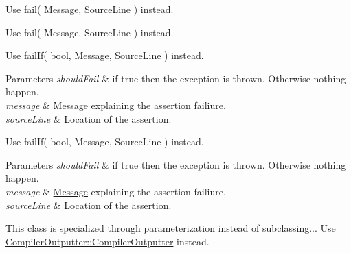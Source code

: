 
\begin{DoxyRefList}
\item[\label{deprecated__deprecated000009}%
\hypertarget{deprecated__deprecated000009}{}%
Member \hyperlink{postprocess_8h_acd2361a766665ce2dbfb3eae201b784d}{ai\+Process\+\_\+\+Convert\+To\+Left\+Handed} ]


\item[\label{deprecated__deprecated000001}%
\hypertarget{deprecated__deprecated000001}{}%
Member \hyperlink{struct_asserter_a63f859e25225743d5d7f6bb50d216192}{Asserter\+:\+:fail} (std\+::string message, const \hyperlink{class_source_line}{Source\+Line} \&source\+Line=\hyperlink{class_source_line}{Source\+Line()})]Use fail( Message, Source\+Line ) instead. 

Use fail( Message, Source\+Line ) instead.  
\item[\label{deprecated__deprecated000002}%
\hypertarget{deprecated__deprecated000002}{}%
Member \hyperlink{struct_asserter_aeea5303f41ac81f9eeff178d19833b1d}{Asserter\+:\+:fail\+If} (bool should\+Fail, std\+::string message, const \hyperlink{class_source_line}{Source\+Line} \&source\+Line=\hyperlink{class_source_line}{Source\+Line()})]Use fail\+If( bool, Message, Source\+Line ) instead. 
\begin{DoxyParams}{Parameters}
{\em should\+Fail} & if {\ttfamily true} then the exception is thrown. Otherwise nothing happen. \\
\hline
{\em message} & \hyperlink{class_message}{Message} explaining the assertion failiure. \\
\hline
{\em source\+Line} & Location of the assertion. \\
\hline
\end{DoxyParams}
Use fail\+If( bool, Message, Source\+Line ) instead. 
\begin{DoxyParams}{Parameters}
{\em should\+Fail} & if {\ttfamily true} then the exception is thrown. Otherwise nothing happen. \\
\hline
{\em message} & \hyperlink{class_message}{Message} explaining the assertion failiure. \\
\hline
{\em source\+Line} & Location of the assertion.  \\
\hline
\end{DoxyParams}

\item[\label{deprecated__deprecated000003}%
\hypertarget{deprecated__deprecated000003}{}%
Member \hyperlink{class_compiler_outputter_aab880d6f8111706e2f08a59f39a800d1}{Compiler\+Outputter\+:\+:default\+Outputter} (\hyperlink{class_test_result_collector}{Test\+Result\+Collector} $\ast$result, O\+Stream \&stream)]This class is specialized through parameterization instead of subclassing... Use \hyperlink{class_compiler_outputter_af2cc635d13fa2ecc5721713513769d91}{Compiler\+Outputter\+::\+Compiler\+Outputter} instead. 


\end{DoxyRefList}
